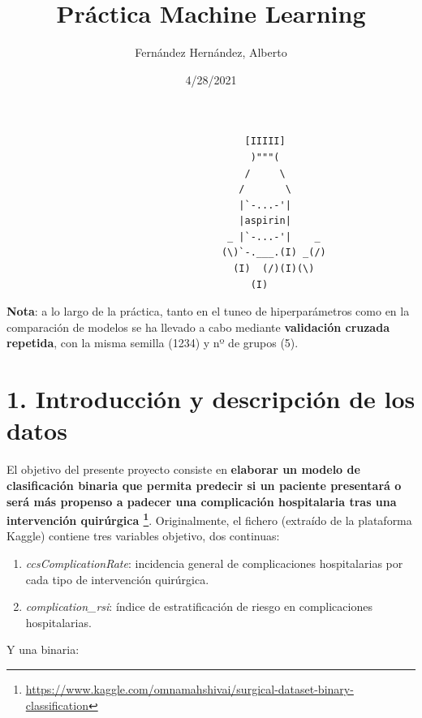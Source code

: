 \documentclass[
]{article}
\title{Práctica Machine Learning}
\author{Fernández Hernández, Alberto}
\date{4/28/2021}
\providecommand{\tightlist}{%
  \setlength{\itemsep}{0pt}\setlength{\parskip}{0pt}}
\begin{document}
\maketitle

\begin{verbatim}
                                         [IIIII]
                                          )"""(
                                         /     \
                                        /       \
                                        |`-...-'|
                                        |aspirin|
                                      _ |`-...-'|    _
                                     (\)`-.___.(I) _(/)
                                       (I)  (/)(I)(\)
                                          (I)        
\end{verbatim}

\textbf{Nota}: a lo largo de la práctica, tanto en el tuneo de
hiperparámetros como en la comparación de modelos se ha llevado a cabo
mediante \textbf{validación cruzada repetida}, con la misma semilla
(1234) y nº de grupos (5).

\newpage

\hypertarget{introducciuxf3n-y-descripciuxf3n-de-los-datos}{%
\section{1. Introducción y descripción de los
datos}\label{introducciuxf3n-y-descripciuxf3n-de-los-datos}}

El objetivo del presente proyecto consiste en \textbf{elaborar un modelo
de clasificación binaria que permita predecir si un paciente presentará
o será más propenso a padecer una complicación hospitalaria tras una
intervención quirúrgica \footnote{\url{https://www.kaggle.com/omnamahshivai/surgical-dataset-binary-classification}}}.
Originalmente, el fichero (extraído de la plataforma Kaggle) contiene
tres variables objetivo, dos continuas:

\begin{enumerate}
\def\labelenumi{\arabic{enumi}.}
\tightlist
\item
  \emph{ccsComplicationRate}: incidencia general de complicaciones
  hospitalarias por cada tipo de intervención quirúrgica.
\item
  \emph{complication\_rsi}: índice de estratificación de riesgo en
  complicaciones hospitalarias.
\end{enumerate}

Y una binaria:
\end{document}
